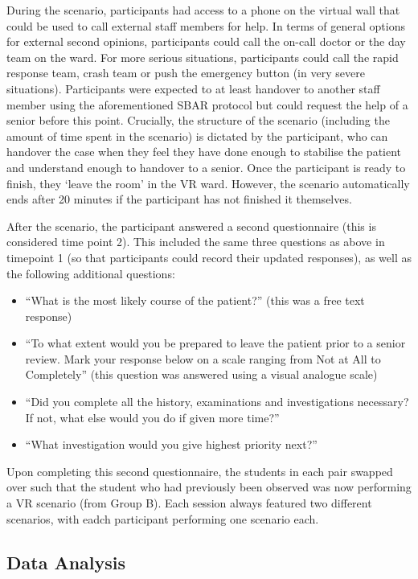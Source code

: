 \documentclass[a4paper, nobind]{templates/ociamthesis}
\providecommand{\tightlist}{%
  \setlength{\itemsep}{0pt}\setlength{\parskip}{0pt}}
\begin{document}
During the scenario, participants had access to a phone on the virtual wall that could be used to call external staff members for help. In terms of general options for external second opinions, participants could call the on-call doctor or the day team on the ward. For more serious situations, participants could call the rapid response team, crash team or push the emergency button (in very severe situations). Participants were expected to at least handover to another staff member using the aforementioned SBAR protocol but could request the help of a senior before this point. Crucially, the structure of the scenario (including the amount of time spent in the scenario) is dictated by the participant, who can handover the case when they feel they have done enough to stabilise the patient and understand enough to handover to a senior. Once the participant is ready to finish, they `leave the room' in the VR ward. However, the scenario automatically ends after 20 minutes if the participant has not finished it themselves.

\hfill\break
After the scenario, the participant answered a second questionnaire (this is considered time point 2). This included the same three questions as above in timepoint 1 (so that participants could record their updated responses), as well as the following additional questions:

\begin{itemize}
\tightlist
\item
  ``What is the most likely course of the patient?'' (this was a free text response)
\item
  ``To what extent would you be prepared to leave the patient prior to a senior review. Mark your response below on a scale ranging from Not at All to Completely'' (this question was answered using a visual analogue scale)
\item
  ``Did you complete all the history, examinations and investigations necessary? If not, what else would you do if given more time?''
\item
  ``What investigation would you give highest priority next?''
\end{itemize}

Upon completing this second questionnaire, the students in each pair swapped over such that the student who had previously been observed was now performing a VR scenario (from Group B). Each session always featured two different scenarios, with eadch participant performing one scenario each.

\subsection*{Data Analysis}\label{data-analysis-2}
\end{document}
